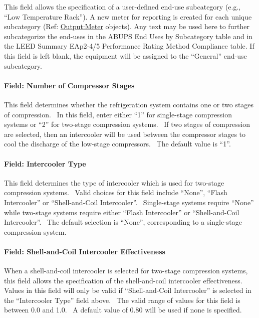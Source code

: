 This field allows the specification of a user-defined end-use subcategory (e.g., ``Low Temperature Rack''). A new meter for reporting is created for each unique subcategory (Ref: \hyperref[outputmeter-and-outputmetermeterfileonly]{Output:Meter} objects). Any text may be used here to further subcategorize the end-uses in the ABUPS End Uses by Subcategory table and in the LEED Summary EAp2-4/5 Performance Rating Method Compliance table. If this field is left blank, the equipment will be assigned to the ``General'' end-use subcategory.

\paragraph{Field: Number of Compressor Stages}\label{field-number-of-compressor-stages}

This field determines whether the refrigeration system contains one or two stages of compression.~ In this field, enter either ``1'' for single-stage compression systems or ``2'' for two-stage compression systems.~ If two stages of compression are selected, then an intercooler will be used between the compressor stages to cool the discharge of the low-stage compressors.~ The default value is ``1''.

\paragraph{Field: Intercooler Type}\label{field-intercooler-type}

This field determines the type of intercooler which is used for two-stage compression systems.~ Valid choices for this field include ``None'', ``Flash Intercooler'' or ``Shell-and-Coil Intercooler''.~ Single-stage systems require ``None'' while two-stage systems require either ``Flash Intercooler'' or ``Shell-and-Coil Intercooler''.~ The default selection is ``None'', corresponding to a single-stage compression system.

\paragraph{Field: Shell-and-Coil Intercooler Effectiveness}\label{field-shell-and-coil-intercooler-effectiveness}

When a shell-and-coil intercooler is selected for two-stage compression systems, this field allows the specification of the shell-and-coil intercooler effectiveness.~ Values in this field will only be valid if ``Shell-and-Coil Intercooler'' is selected in the ``Intercooler Type'' field above.~ The valid range of values for this field is between 0.0 and 1.0.~ A default value of 0.80 will be used if none is specified.


